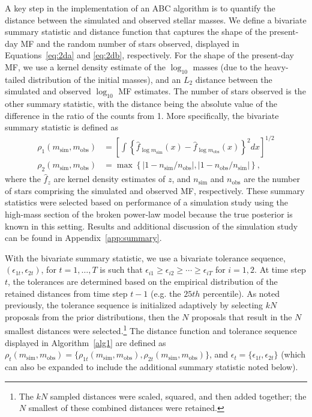 \documentclass[ejs]{imsart}
\numberwithin{equation}{section}
\theoremstyle{plain}
\newcommand{\msim}{m_{\text{sim}}}
\newcommand{\mobs}{m_{\text{obs}}}
\newcommand{\nsim}{n_{\text{sim}}}
\newcommand{\nobs}{n_{\text{obs}}}
\begin{document}
A key step in the implementation of an ABC algorithm is to quantify the distance between the simulated and observed stellar masses.  We define a bivariate summary statistic and distance function that captures the shape of the present-day MF and the random number of stars observed, displayed in Equations~\eqref{eq:2da} and \eqref{eq:2db}, respectively.  For the shape of the present-day MF, we use a kernel density estimate of the $\log_{10}$ masses (due to the heavy-tailed distribution of the initial masses), and an $L_2$ distance between the simulated and observed $\log_{10}$ MF estimates.  
The number of stars observed is the other summary statistic, with the distance being the absolute value of the difference in the ratio of the counts from 1. More specifically, the bivariate summary statistic is defined as
\begin{align}
\rho_1(\msim, \mobs) &= \left [\displaystyle \int \left \{\hat f_{\log \msim}(x) - \hat f_{\log \mobs}(x) \right \}^2 dx \right]^{1/2} \label{eq:2da} \\ 
\rho_2(\msim, \mobs) &= \max\left\{\left|1 - \nsim/ \nobs\right |, \left|1 - \nobs/ \nsim\right |  \right\} \text{,}   \label{eq:2db}
\end{align}
where the $\hat f_z$ are kernel density estimates of $z$, and $\nsim$ and $\nobs$ are the number of stars comprising the simulated and observed MF, respectively.  These summary statistics were selected based on performance of a simulation study using the high-mass section of the broken power-law model because the true posterior is known in this setting.  Results and additional discussion of the simulation study can be found in Appendix~\ref{app:summary}.  


With the bivariate summary statistic, we use a bivariate tolerance sequence, $(\epsilon_{1t}, \epsilon_{2t})$, for $t = 1, \ldots, T$ is such that $\epsilon_{i1} \geq \epsilon_{i2} \geq \cdots \geq \epsilon_{iT}$ for $i = 1, 2$.  At time step $t$, the tolerances are determined based on the  empirical distribution of the retained distances from time step $t-1$ (e.g. the $25th$ percentile).  As noted previously, the tolerance sequence is initialized adaptively by selecting $kN$ proposals from the prior distributions, then the $N$ proposals that result in the $N$ smallest distances were selected.\footnote{The $kN$ sampled distances were scaled, squared, and then added together; the $N$ smallest of these combined distances were retained.}
The distance function and tolerance sequence displayed in Algorithm~\eqref{alg1} are defined as $\rho_t(\msim, \mobs) = \{\rho_{1t}(\msim, \mobs), \rho_{2t}(\msim, \mobs)\}$, and $\epsilon_t = \{\epsilon_{1t}, \epsilon_{2t}\}$ (which can also be expanded to include the additional summary statistic noted below).
\end{document}
